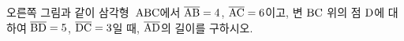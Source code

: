 \noindent\begin{minipage}[t]{0.58\linewidth}\vspace{0pt}\raggedright 오른쪽 그림과 같이 삼각형~$\mathrm{ABC}$에서 $\overline{\mathrm{AB}}=4$, $\overline{\mathrm{AC}}=6$이고, 변 $\mathrm{BC}$ 위의 점 $\mathrm{D}$에 대하여 $\overline{\mathrm{BD}}=5$, $\overline{\mathrm{DC}}=3$일 때, $\overline{\mathrm{AD}}$의 길이를 구하시오.\end{minipage}\hfill\begin{minipage}[t]{0.4\linewidth}\vspace{0pt}\centering \resizebox{\ifdim\width>\linewidth\linewidth\else\width\fi}{!}{}\end{minipage}\par
